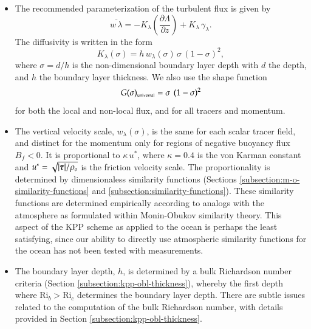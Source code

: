 \begin{itemize}

\item The recommended parameterization of the turbulent flux is given
  by
\begin{equation}
  \overline{w \, \lambda} = -K_{\lambda} \left( \frac{\partial \Lambda}{\partial z}  \right)
   +  K_{\lambda}  \, \gamma_{\lambda}.
\label{eq:kpp-parameterization-summary}
\end{equation}
 The diffusivity is written in the form 
\begin{equation}
  K_{\lambda}(\sigma) = h \, w_{\lambda}(\sigma) \, \sigma \, (1-\sigma)^{2},
\label{eq:kpp-diffusivity-and-yet-again}
\end{equation}
where $\sigma = d/h$ is the non-dimensional boundary layer depth with
$d$ the depth, and $h$ the boundary layer thickness. We also use the
shape function
\begin{equation}
  G(\sigma)_{\mbox{\tiny universal}} = \sigma \, \ (1-\sigma)^{2}
\end{equation}
for both the local and non-local flux, and for all tracers and
momentum.

\item The vertical velocity scale, $w_{\lambda}(\sigma)$, is the same
  for each scalar tracer field, and distinct for the momentum only for
  regions of negative buoyancy flux $B_{f} < 0$.  It is proportional
  to $\kappa \, u^{*}$, where $\kappa = 0.4$ is the von Karman
  constant and $u^{*} = \sqrt{|\mbox{\boldmath $\tau$}|/\rho_{o}}$ is the friction
  velocity scale.  The proportionality is determined by dimensionaless
  similarity functions (Sections
  \ref{subsection:m-o-similarity-functions} and
  \ref{subsection:similarity-functions}).  These similarity functions
  are determined empirically according to analogs with the atmosphere
  as formulated within Monin-Obukov similarity theory.  This aspect of
  the KPP scheme as applied to the ocean is perhaps the least
  satisfying, since our ability to directly use atmospheric similarity
  functions for the ocean has not been tested with measurements.

\item The boundary layer depth, $h$, is determined by a bulk
  Richardson number criteria (Section
  \ref{subsection:kpp-obl-thickness}), whereby the first depth where
  $\mbox{Ri}_{b} > \mbox{Ri}_{c}$ determines the boundary layer depth.
  There are subtle issues related to the computation of the bulk
  Richardson number, with details provided in Section
  \ref{subsection:kpp-obl-thickness}.


\end{itemize}
